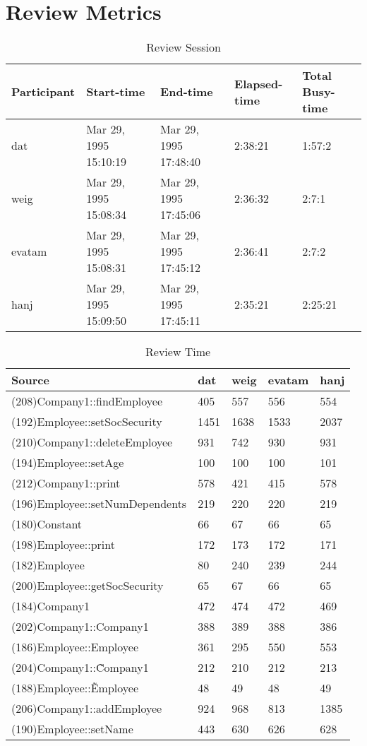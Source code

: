 \section{Review Metrics}
\begin{table}[hb]
\begin{center}
\begin{tabular}{|l|l|l|l|l|}
\hline
Participant & Start-time & End-time & Elapsed-time & Total Busy-time \\
\hline
dat & Mar 29, 1995 15:10:19 & Mar 29, 1995 17:48:40 & 2:38:21 & 1:57:2 \\
weig & Mar 29, 1995 15:08:34 & Mar 29, 1995 17:45:06 & 2:36:32 & 2:7:1 \\
evatam & Mar 29, 1995 15:08:31 & Mar 29, 1995 17:45:12 & 2:36:41 & 2:7:2 \\
hanj & Mar 29, 1995 15:09:50 & Mar 29, 1995 17:45:11 & 2:35:21 & 2:25:21 \\
\hline
\end{tabular}
\end{center}
\caption{Review Session}
\end{table}


\begin{table}[hb]
\begin{center}
\begin{tabular}{|l|l|l|l|l|}
\hline
Source & dat & weig & evatam & hanj\\
\hline
(208)Company1::findEmployee & 405 & 557 & 556 & 554\\
(192)Employee::setSocSecurity & 1451 & 1638 & 1533 & 2037\\
(210)Company1::deleteEmployee & 931 & 742 & 930 & 931\\
(194)Employee::setAge & 100 & 100 & 100 & 101\\
(212)Company1::print & 578 & 421 & 415 & 578\\
(196)Employee::setNumDependents & 219 & 220 & 220 & 219\\
(180)Constant & 66 & 67 & 66 & 65\\
(198)Employee::print & 172 & 173 & 172 & 171\\
(182)Employee & 80 & 240 & 239 & 244\\
(200)Employee::getSocSecurity & 65 & 67 & 66 & 65\\
(184)Company1 & 472 & 474 & 472 & 469\\
(202)Company1::Company1 & 388 & 389 & 388 & 386\\
(186)Employee::Employee & 361 & 295 & 550 & 553\\
(204)Company1::\~Company1 & 212 & 210 & 212 & 213\\
(188)Employee::\~Employee & 48 & 49 & 48 & 49\\
(206)Company1::addEmployee & 924 & 968 & 813 & 1385\\
(190)Employee::setName & 443 & 630 & 626 & 628\\
\hline
\end{tabular}
\end{center}
\caption{Review Time}
\end{table}


